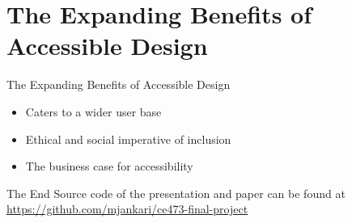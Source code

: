 \documentclass{beamer}
\begin{document}
\section{The Expanding Benefits of Accessible Design}
\begin{frame}{The Expanding Benefits of Accessible Design}
    \begin{itemize}
        \item Caters to a wider user base
        \item Ethical and social imperative of inclusion
        \item The business case for accessibility
    \end{itemize}
\end{frame}

\begin{frame}{The End}
Source code of the presentation and paper can be found at
\url{https://github.com/mjankari/ce473-final-project}
\end{frame}
\end{document}
